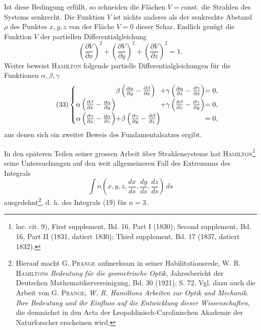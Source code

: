 Ist diese Bedingung erfüllt, so schneiden die Flächen $V=\text{const.}$ die
Strahlen des Systems senkrecht. Die Funktion $V$ ist nichts anderes als der
senkrechte Abstand $\rho$ des Punktes $x,y,z$ von der Fläche $V=0$ dieser Schar.
Endlich genügt die Funktion $V$ der partiellen Differentialgleichung
\clearpage{}
\begin{equation*}\tag{32}
\left(\frac{\partial V}{\partial x}\right)^2+\left(\frac{\partial V}{\partial y}\right)^2+\left(\frac{\partial V}{\partial z}\right)^2=1.
\end{equation*}
Weiter beweist \textsc{Hamilton} folgende partielle Differentialgleichungen für die
Funktionen $\alpha,\beta,\gamma$
\begin{equation*}\tag{33}
\left\{\begin{array}{@{}r@{}l@{}l@{}l@{}}
&\beta\left(\frac{\partial\alpha}{\partial y}-\frac{\partial\beta}{\partial x}\right)&+\gamma\left(\frac{\partial\alpha}{\partial z}-\frac{\partial\gamma}{\partial x}\right)&=0,\\[1.1ex]
\alpha\left(\frac{\partial\beta}{\partial x}-\frac{\partial\alpha}{\partial y}\right)&&+\gamma\left(\frac{\partial\beta}{\partial z}-\frac{\partial\gamma}{\partial y}\right)&=0,\\[1.1ex]
\alpha\left(\frac{\partial\gamma}{\partial x}-\frac{\partial\alpha}{\partial z}\right)&+\beta\left(\frac{\partial\gamma}{\partial y}-\frac{\partial\beta}{\partial z}\right)&&=0,
\end{array}\right.
\end{equation*}
aus denen sich ein zweiter Beweis des Fundamentalsatzes ergibt.

In den späteren Teilen seiner grossen Arbeit über Strahlensysteme hat
\textsc{Hamilton}\footnote{loc. cit. 9), First supplement, Bd. 16, Part I (1830); Second supplement, Bd. 16, Part II (1831,
datiert 1830); Third supplement, Bd. 17 (1837, datiert 1832).} seine Untersuchungen auf den weit allgemeineren Fall des Extremums
des Integrals
\[
\int n\left(x,y,z,\frac{dx}{ds},\frac{dy}{ds},\frac{dz}{ds}\right)\,ds
\]
ausgedehnt\footnote{Hierauf macht G. \textsc{Prange} aufmerksam in seiner Habilitationsrede, W. R. \textsc{Hamilton}s \textit{Bedeutung
für die geometrische Optik}, Jahresbericht der Deutschen Mathematikervereinigung, Bd. 30 (1921), S. 72.
Vgl. dazu auch die Arbeit von G. \textsc{Prange}, \textit{W. R. Hamiltons Arbeiten zur Optik und Mechanik. Ihre
Bedeutung und ihr Einfluss auf die Entwicklung dieser Wissenschaften}, die demnächst in den Acta der
Leopoldinisch-Carolinischen Akademie der Naturforscher erscheinen wird.}, d. h. des Integrals (19) für $n=3$.
\par\clearpage\endgroup
